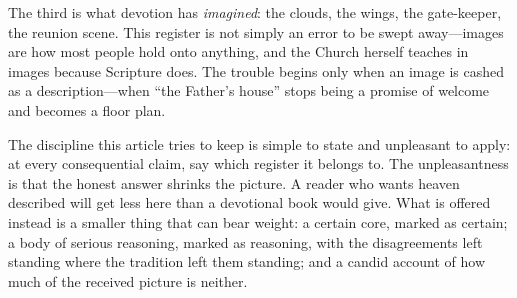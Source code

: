 The third is what devotion has \emph{imagined}: the clouds, the wings, the gate-keeper, the reunion scene. This register is not simply an error to be swept away---images are how most people hold onto anything, and the Church herself teaches in images because Scripture does. The trouble begins only when an image is cashed as a description---when ``the Father's house'' stops being a promise of welcome and becomes a floor plan.

The discipline this article tries to keep is simple to state and unpleasant to apply: at every consequential claim, say which register it belongs to. The unpleasantness is that the honest answer shrinks the picture. A reader who wants heaven described will get less here than a devotional book would give. What is offered instead is a smaller thing that can bear weight: a certain core, marked as certain; a body of serious reasoning, marked as reasoning, with the disagreements left standing where the tradition left them standing; and a candid account of how much of the received picture is neither.

